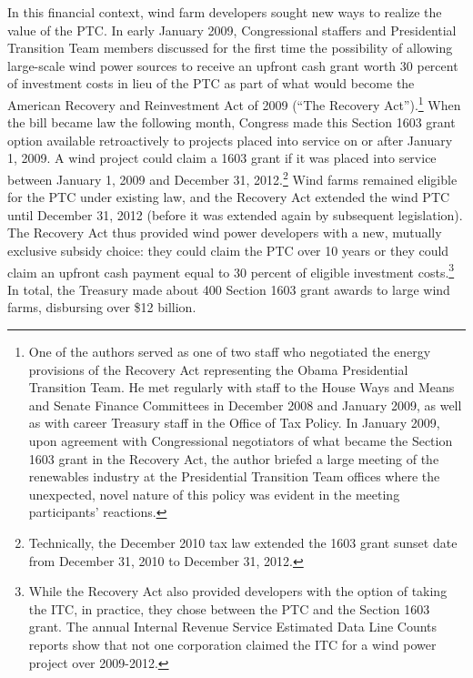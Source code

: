 \documentclass[12pt]{article}
\begin{document}
In this financial context, wind farm developers sought new ways to realize the value of the PTC. In early January 2009, Congressional staffers and Presidential Transition Team members discussed for the first time the possibility of allowing large-scale wind power sources to receive an upfront cash grant worth 30 percent of investment costs in lieu of the PTC as part of what would become the American Recovery and Reinvestment Act of 2009 (``The Recovery Act'').\footnote{One of the authors served as one of two staff who negotiated the energy provisions of the Recovery Act representing the Obama Presidential Transition Team. He met regularly with staff to the House Ways and Means and Senate Finance Committees in December 2008 and January 2009, as well as with career Treasury staff in the Office of Tax Policy. In January 2009, upon agreement with Congressional negotiators of what became the Section 1603 grant in the Recovery Act, the author briefed a large meeting of the renewables industry at the Presidential Transition Team offices where the unexpected, novel nature of this policy was evident in the meeting participants' reactions.} When the bill became law the following month, Congress made this Section 1603 grant option available retroactively to projects placed into service on or after January 1, 2009. A wind project could claim a 1603 grant if it was placed into service between January 1, 2009 and December 31, 2012.\footnote{Technically, the December 2010 tax law extended the 1603 grant sunset date from December 31, 2010 to December 31, 2012.} Wind farms remained eligible for the PTC under existing law, and the Recovery Act extended the wind PTC until December 31, 2012 (before it was extended again by subsequent legislation). The Recovery Act thus provided wind power developers with a new, mutually exclusive subsidy choice: they could claim the PTC over 10 years or they could claim an upfront cash payment equal to 30 percent of eligible investment costs.\footnote{While the Recovery Act also provided developers with the option of taking the ITC, in practice, they chose between the PTC and the Section 1603 grant. The annual Internal Revenue Service Estimated Data Line Counts reports show that not one corporation claimed the ITC for a wind power project over 2009-2012.} In total, the Treasury made about 400 Section 1603 grant awards to large wind farms, disbursing over \$12 billion.
\end{document}

